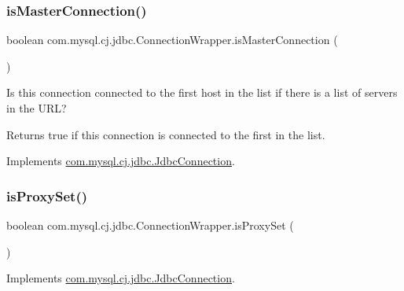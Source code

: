 \subsubsection{\texorpdfstring{is\+Master\+Connection()}{isMasterConnection()}}
{\footnotesize\ttfamily boolean com.\+mysql.\+cj.\+jdbc.\+Connection\+Wrapper.\+is\+Master\+Connection (\begin{DoxyParamCaption}{ }\end{DoxyParamCaption})}

Is this connection connected to the first host in the list if there is a list of servers in the U\+RL?

\begin{DoxyReturn}{Returns}
true if this connection is connected to the first in the list. 
\end{DoxyReturn}


Implements \mbox{\hyperlink{interfacecom_1_1mysql_1_1cj_1_1jdbc_1_1_jdbc_connection_a012dc133872dd4d6db6d6f98118d3251}{com.\+mysql.\+cj.\+jdbc.\+Jdbc\+Connection}}.

\mbox{\label{classcom_1_1mysql_1_1cj_1_1jdbc_1_1_connection_wrapper_a1461282781c69e4e966160e0656d4c5d}} 
\subsubsection{\texorpdfstring{is\+Proxy\+Set()}{isProxySet()}}
{\footnotesize\ttfamily boolean com.\+mysql.\+cj.\+jdbc.\+Connection\+Wrapper.\+is\+Proxy\+Set (\begin{DoxyParamCaption}{ }\end{DoxyParamCaption})}



Implements \mbox{\hyperlink{interfacecom_1_1mysql_1_1cj_1_1jdbc_1_1_jdbc_connection_abf3c640bcdbc0839cd67ed0e9b7d94a1}{com.\+mysql.\+cj.\+jdbc.\+Jdbc\+Connection}}.

\mbox{\label{classcom_1_1mysql_1_1cj_1_1jdbc_1_1_connection_wrapper_ab2d583e2ce4875c55ce7b20f0cc655a0}} 
